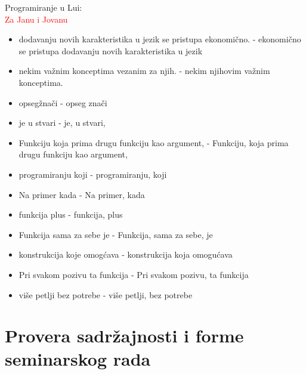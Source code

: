 \documentclass[a4paper]{report}
\newcommand{\note}[1]{\textcolor{red}{#1}}
\begin{document}
{Programiranje u Lui: \\
\note{Za Janu i Jovanu}
\begin{itemize}
  \item dodavanju novih karakteristika u jezik se pristupa ekonomično. - ekonomično se pristupa dodavanju novih karakteristika u jezik
  \item nekim važnim konceptima vezanim za njih.  - nekim njihovim važnim konceptima.
  \item opsegžnači -  opseg znači
  \item  je u stvari - je, u stvari,
  \item  Funkciju koja prima drugu funkciju kao argument, - Funkciju, koja prima drugu funkciju kao argument,
  \item programiranju koji - programiranju, koji
  \item  Na primer kada -  Na primer, kada
  \item   funkcija plus -  funkcija, plus
  \item  Funkcija sama za sebe je - Funkcija, sama za sebe, je     
  \item  konstrukcija koje omogćava - konstrukcija koja omogućava
  \item   Pri svakom pozivu ta funkcija  -  Pri svakom pozivu, ta funkcija 
  \item  više petlji bez potrebe - više petlji, bez potrebe
\end{itemize}
}

\section{Provera sadržajnosti i forme seminarskog rada}
\end{document}
